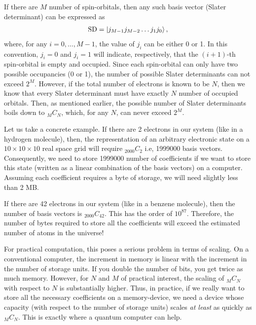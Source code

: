 \documentclass[12pt,oneside]{book}
\begin{document}
If there are $M$ number of spin-orbitals, then any such basis vector (Slater determinant) can be expressed as
\begin{align}\label{SD_OccupationRepresentation}
    \mathrm{SD}=\ket{j_{M-1}j_{M-2}\hdots j_1 j_0},
\end{align}
where, for any $i=0,\hdots,M-1$, the value of $j_i$ can be either 0 or 1. In this convention, $j_i=0$ and $j_i=1$ will indicate, respectively, that the $(i+1)$-th spin-orbital is empty and occupied. Since each spin-orbital can only have two possible occupancies (0 or 1), the number of possible Slater determinants can not exceed $2^M$. However, if the total number of electrons is known to be $N$, then we know that every Slater determinant must have exactly $N$ number of occupied orbitals. Then, as mentioned earlier, the possible number of Slater determinants boils down to $_MC_N$, which, for any $N$, can never exceed $2^M$.

Let us take a concrete example. If there are 2 electrons in our system (like in a hydrogen molecule), then, the representation of an arbitrary electronic state on a $10 \times 10 \times 10$ real space grid will require $_{2000}C_2$ i.e, 1999000 basis vectors. Consequently, we need to store 1999000 number of coefficients if we want to store this state (written as a linear combination of the basis vectors) on a computer. Assuming each coefficient requires a byte of storage, we will need slightly less than 2 MB. 

If there are 42 electrons in our system (like in a benzene molecule), then the number of basis vectors is $_{2000}C_{42}$. This has the order of $10^{87}$. Therefore, the number of bytes required to store all the coefficients will exceed the estimated number of atoms in the universe!

For practical computation, this poses a serious problem in terms of scaling. On a conventional computer, the increment in memory is linear with the increment in the number of storage units. If you double the number of bits, you get twice as much memory. However, for $N$ and $M$ of practical interest, the scaling of $_{M}C_N$  with respect to $N$ is substantially higher. Thus, in practice, if we really want to store all the necessary coefficients on a memory-device, we need a device whose capacity (with respect to the number of storage units) scales \textit{at least} as quickly as $_{M}C_N$. This is exactly where a quantum computer can help.


\end{document}
